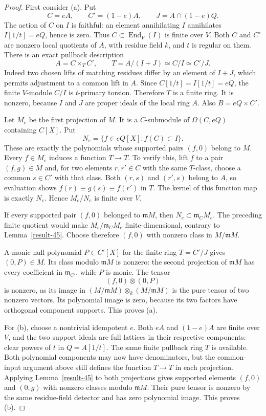 \documentclass[11pt,a4paper]{article}
\theoremstyle{definition}
\begin{document}
\begin{proof}
First consider (a). Put
\[
 C=eA,\qquad C'=(1-e)A,\qquad J=A\cap(1-e)Q.
\]
The action of $C$ on $I$ is faithful: an element annihilating
$I$ annihilates $I[1/t]=eQ$, hence is zero. Thus
$C\subset\operatorname{End}_V(I)$ is finite over $V$.
Both $C$ and $C'$ are nonzero local quotients of $A$, with
residue field $k$, and $t$ is regular on them.
There is an exact pullback description
\[
 A=C\times_T C',\qquad T=A/(I+J)\simeq C/I\simeq C'/J.
\]
Indeed two chosen lifts of matching residues differ by an element
of $I+J$, which permits adjustment to a common lift in $A$.
Since $C[1/t]=I[1/t]=eQ$, the finite $V$-module $C/I$ is
$t$-primary torsion. Therefore $T$ is a finite ring. It is
nonzero, because $I$ and $J$ are proper ideals of the local ring
$A$. Also $B=eQ\times C'$.

Let $M_e$ be the first projection of $M$. It is a $C$-submodule
of $\Omega(C,eQ)$ containing $C[X]$. Put
\[
 N_e=\{f\in eQ[X]:f(C)\subset I\}.
\]
These are exactly the polynomials whose supported pairs $(f,0)$
belong to $M$. Every $f\in M_e$ induces a function $T\to T$.
To verify this, lift $f$ to a pair $(f,g)\in M$ and, for two
elements $r,r'\in C$ with the same $T$-class, choose a common
$s\in C'$ with that class. Both $(r,s)$ and $(r',s)$ belong
to $A$, so evaluation shows $f(r)\equiv g(s)\equiv f(r')$
in $T$. The kernel of this function map is exactly $N_e$.
Hence $M_e/N_e$ is finite over $V$.

If every supported pair $(f,0)$ belonged to $\mathfrak mM$,
then $N_e\subset\mathfrak m_C M_e$. The preceding finite
quotient would make $M_e/\mathfrak m_C M_e$ finite-dimensional,
contrary to Lemma~\ref{result-45}. Choose therefore $(f,0)$
with nonzero class in $M/\mathfrak mM$.

A monic null polynomial $P\in C'[X]$ for the finite ring
$T=C'/J$ gives $(0,P)\in M$. Its class modulo $\mathfrak mM$
is nonzero: the second projection of $\mathfrak mM$ has every
coefficient in $\mathfrak m_{C'}$, while $P$ is monic.
The tensor
\[
                    (f,0)\otimes(0,P)
\]
is nonzero, as its image in
$(M/\mathfrak mM)\otimes_k(M/\mathfrak mM)$ is the pure
tensor of two nonzero vectors. Its polynomial image is zero,
because its two factors have orthogonal component supports.
This proves (a).

For (b), choose a nontrivial idempotent $e$. Both $eA$ and
$(1-e)A$ are finite over $V$, and the two support ideals are
full lattices in their respective components: clear powers
of $t$ in $Q=A[1/t]$. The same finite pullback ring $T$ is
available. Both polynomial components may now have denominators,
but the common-input argument above still defines the function
$T\to T$ in each projection. Applying Lemma~\ref{result-45}
to both projections gives supported elements $(f,0)$ and
$(0,g)$ with nonzero classes modulo $\mathfrak mM$.
Their pure tensor is nonzero by the same residue-field
detector and has zero polynomial image. This proves (b).
\end{proof}
\end{document}
